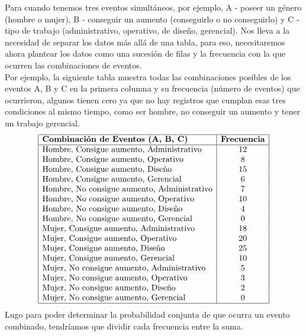 \documentclass{article}
\begin{document}
Para cuando tenemos tres eventos simultáneos, por ejemplo, A - poseer un género (hombre o mujer), B - conseguir un aumento (conseguirlo o no conseguirlo) y C - tipo de trabajo (administrativo, operativo, de diseño, gerencial). Nos lleva a la necesidad de separar los datos más allá de una tabla, para eso, necesitaremos ahora plantear los datos como una sucesión de filas y la frecuencia con la que ocurren las combinaciones de eventos.
\\[12pt]
Por ejemplo, la siguiente tabla muestra todas las combinaciones posibles de los eventos A, B y C en la primera columna y su frecuencia (número de eventos) que ocurrieron, algunos tienen cero ya que no hay registros que cumplan esas tres condiciones al mismo tiempo, como ser hombre, no conseguir un aumento y tener un trabajo gerencial.
\[
\begin{array}{|l|c|}
\hline
\textbf{Combinación de Eventos (A, B, C)} & \textbf{Frecuencia} \\
\hline
\text{Hombre, Consigue aumento, Administrativo} & 12 \\
\text{Hombre, Consigue aumento, Operativo} & 8 \\
\text{Hombre, Consigue aumento, Diseño} & 15 \\
\text{Hombre, Consigue aumento, Gerencial} & 6 \\
\text{Hombre, No consigue aumento, Administrativo} & 7 \\
\text{Hombre, No consigue aumento, Operativo} & 10 \\
\text{Hombre, No consigue aumento, Diseño} & 4 \\
\text{Hombre, No consigue aumento, Gerencial} & 0 \\
\text{Mujer, Consigue aumento, Administrativo} & 18 \\
\text{Mujer, Consigue aumento, Operativo} & 20 \\
\text{Mujer, Consigue aumento, Diseño} & 25 \\
\text{Mujer, Consigue aumento, Gerencial} & 10 \\
\text{Mujer, No consigue aumento, Administrativo} & 5 \\
\text{Mujer, No consigue aumento, Operativo} & 3 \\
\text{Mujer, No consigue aumento, Diseño} & 2 \\
\text{Mujer, No consigue aumento, Gerencial} & 0 \\
\hline
\end{array}
\]
Lugo para poder determinar la probabilidad conjunta de que ocurra un evento combinado, tendríamos que dividir cada frecuencia entre la suma.
\end{document}
